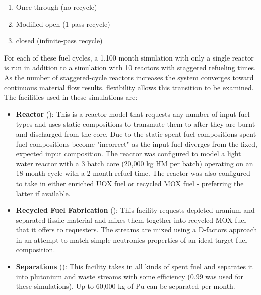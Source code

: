 \begin{enumerate}
    \item Once through (no recycle) 
    \item Modified open (1-pass recycle)
    \item closed (infinite-pass recycle)
\end{enumerate}

For each of these fuel cycles, a 1,100 month \Cyclus simulation with only a
single reactor is run in addition to a simulation with 10 reactors with
staggered refueling times.  As the number of staggered-cycle reactors
increases the system converges toward continuous material flow results.
\Cyclus flexibility allows this transition to be examined.  The facilities
used in these simulations are:

\begin{itemize}

    \item \textbf{Reactor} (): This is a reactor
        model that requests any number of input fuel types and uses static
        compositions to transmute them to after they are burnt and discharged
        from the core.  Due to the static spent fuel compositions spent fuel
        compositions become "incorrect" as the input fuel diverges from the
        fixed, expected input composition. The reactor was configured to model
        a light water reactor with a 3 batch core (20,000 kg HM per batch)
        operating on an 18 month cycle with a 2 month refuel time.  The
        reactor was also configured to take in either enriched UOX fuel or
        recycled MOX fuel - preferring the latter if available.

    \item \textbf{Recycled Fuel Fabrication} (): This
        facility requests depleted uranium and separated fissile material and
        mixes them together into recycled MOX fuel that it offers to
        requesters.  The streams are mixed using a D-factors approach
         in an attempt to match simple neutronics
        properties of an ideal target fuel composition.

    \item \textbf{Separations} (): This facility
        takes in all kinds of spent fuel and separates it into plutonium and
        waste streams with some efficiency (0.99 was used for these
        simulations).  Up to 60,000 kg of Pu can be separated per month.


\end{itemize}
